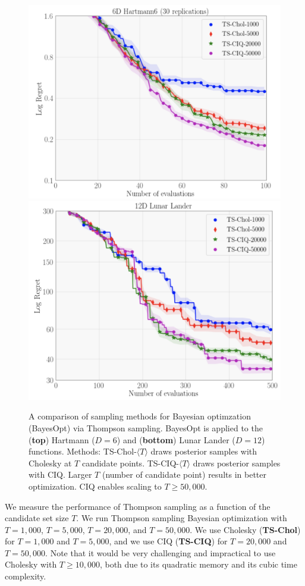 \begin{figure}[t!]
  \centering
  \includegraphics[width=0.72\linewidth]{figures/hartmann6.png}
  \includegraphics[width=0.7\linewidth]{figures/lunar_lander.png}
  \caption[
    A comparison of sampling methods for Bayesian optimzation (BayesOpt) via Thompson sampling.
    BayesOpt is applied to the Hartmann ($D=6$) and Lunar Lander ($D=12$) functions.
  ]{
    A comparison of sampling methods for Bayesian optimzation (BayesOpt) via Thompson sampling.
    BayesOpt is applied to the ({\bf top}) Hartmann ($D=6$) and ({\bf bottom}) Lunar Lander ($D=12$) functions.
    Methods: TS-Chol-$\langle T \rangle$ draws posterior samples with Cholesky at $T$ candidate points.
    TS-CIQ-$\langle T \rangle$ draws posterior samples with CIQ.
    Larger $T$ (number of candidate point) results in better optimization.
    CIQ enables scaling to $T\geq50,\!000$.
  }
  \label{fig:hartmann6_lunar}
\end{figure}

We measure the performance of Thompson sampling as a function of the candidate set size $T$.
We run Thompson sampling Bayesian optimization with $T=1,\!000$, $T=5,\!000$, $T=20,\!000$, and $T=50,\!000$.
We use Cholesky ({\bf TS-Chol}) for $T=1,\!000$ and $T=5,\!000$, and we use CIQ ({\bf TS-CIQ}) for $T=20,\!000$ and $T=50,\!000$.
Note that it would be very challenging and impractical to use Cholesky with $T\geq10,\!000$, both due to its quadratic memory and its cubic time complexity.

